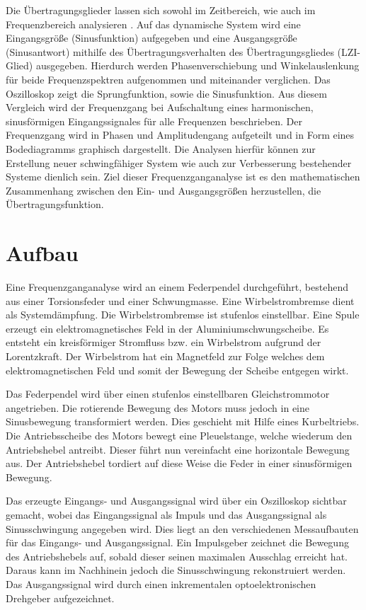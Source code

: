 \documentclass[a4paper,12pt]{scrartcl}
\begin{document}
Die Übertragungsglieder lassen sich sowohl im Zeitbereich, wie auch im Frequenzbereich analysieren \cite{RegTech}.
Auf das dynamische System wird eine Eingangsgröße (Sinusfunktion) aufgegeben und eine Ausgangsgröße (Sinusantwort) mithilfe des Übertragungs\-verhalten des Übertragungsgliedes (LZI-Glied) ausgegeben.
Hierdurch werden Phasenverschiebung und Winkelauslenkung für beide Frequenzspektren aufgenommen und miteinander verglichen.
Das Oszilloskop zeigt die Sprungfunktion, sowie die Sinusfunktion.
Aus diesem Vergleich wird der Frequenzgang bei Aufschaltung eines harmonischen, sinusförmigen Eingangssignales für alle Frequenzen beschrieben.
Der Frequenzgang wird in Phasen und Amplitudengang aufgeteilt und in Form eines Bodediagramms graphisch dargestellt.
Die Analysen hierfür können zur Erstellung neuer schwingfähiger System wie auch zur Verbesserung bestehender Systeme dienlich sein.
Ziel dieser Frequenzganganalyse ist es den mathematischen Zusammenhang zwischen den Ein- und Ausgangsgrößen herzustellen, die Übertragungsfunktion.

\section{Aufbau}

Eine Frequenzganganalyse wird an einem Federpendel durchgeführt, bestehend aus einer Torsionsfeder und einer Schwungmasse.
Eine Wirbelstrombremse dient als Systemdämpfung. Die Wirbelstrombremse ist stufenlos einstellbar. Eine Spule erzeugt ein elektromagnetisches
Feld in der Aluminiumschwungscheibe. Es entsteht ein kreisförmiger Stromfluss bzw. ein Wirbelstrom aufgrund der Lorentzkraft.
Der Wirbelstrom hat ein Magnetfeld zur Folge welches dem elektromagnetischen Feld und somit der Bewegung der Scheibe entgegen wirkt.

Das Federpendel wird über einen stufenlos einstellbaren Gleichstrommotor angetrieben. Die rotierende Bewegung des Motors muss jedoch in eine
Sinusbewegung transformiert werden. Dies geschieht mit Hilfe eines Kurbeltriebs. Die Antriebsscheibe des Motors bewegt eine Pleuelstange,
welche wiederum den Antriebshebel antreibt. Dieser führt nun vereinfacht eine horizontale Bewegung aus.
Der Antriebshebel tordiert auf diese Weise die Feder in einer sinusförmigen Bewegung.

Das erzeugte Eingangs- und Ausgangssignal wird über ein Oszilloskop sichtbar gemacht, wobei das Eingangssignal als Impuls und das Ausgangssignal
als Sinusschwingung angegeben wird. Dies liegt an den verschiedenen Messaufbauten für das Eingangs- und Ausgangssignal. Ein Impulsgeber zeichnet
die Bewegung des Antriebshebels auf, sobald dieser seinen maximalen Ausschlag erreicht hat. Daraus kann im Nachhinein jedoch die Sinusschwingung
rekonstruiert werden. Das Ausgangssignal wird durch einen inkrementalen optoelektronischen Drehgeber aufgezeichnet.
\end{document}
